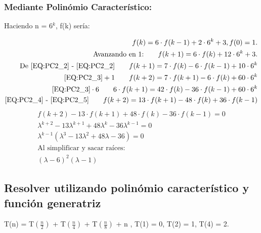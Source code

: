 	\subsubsection{Mediante Polinómio Característico:}
		\begin{center}	
			Haciendo n = 6$^{k}$, f(k) sería:
		\end{center}
		\begin{eqnarray}
			\label{EQ:PC2_1}f(k) = 6 \cdot f(k-1) + 2 \cdot 6^{k} + 3, f(0) = 1.\\
			\label{EQ:PC2_2}\text{Avanzando en 1:}\qquad f(k+1) = 6 \cdot f(k) + 12 \cdot 6^{k} + 3.\\
			\label{EQ:PC2_3}\text{De \ref{EQ:PC2_2} - \ref{EQ:PC2_2}} \qquad f(k+1) = 7 \cdot f(k) - 6 \cdot f(k-1) + 10 \cdot 6^{k}\\
			\label{EQ:PC2_4} \text{\ref{EQ:PC2_3}} +1 \qquad f(k+2) = 7 \cdot f(k+1) - 6 \cdot f(k) + 60 \cdot 6^{k}\\
			\label{EQ:PC2_5} \text{\ref{EQ:PC2_3}} \cdot6 \qquad 6 \cdot f(k+1) = 42 \cdot f(k) - 36 \cdot f(k-1) + 60 \cdot 6^{k}\\
			\label{EQ:PC2_6} \text{\ref{EQ:PC2_4} - \ref{EQ:PC2_5}} \qquad f(k+2) = 13 \cdot f(k+1) - 48 \cdot f(k) + 36 \cdot f(k-1)
		\end{eqnarray}
		\begin{eqnarray*}
			f(k+2) - 13 \cdot f(k+1) + 48 \cdot f(k) - 36 \cdot f(k-1) = 0\\
			\lambda^{k+2} - 13 \lambda^{k+1} + 48 \lambda^{k} - 36 \lambda^{k-1} = 0\\
			\lambda^{k-1}(\lambda^3 - 13\lambda^2 + 48\lambda - 36) = 0\\
			\text{Al simplificar y sacar raíces:} \qquad\\
			(\lambda - 6)^2 (\lambda - 1)
		\end{eqnarray*}		

\subsection{Resolver utilizando polinómio característico y función generatriz}
	\begin{center}
		T(n) = T$\left(\frac{n}{2}\right)$ + T$\left(\frac{n}{4}\right)$ + T$\left(\frac{n}{8}\right)$ + n , T(1) = 0, T(2) = 1, T(4) = 2.
	\end{center}
	
